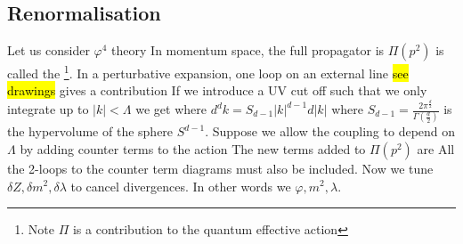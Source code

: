 \documentclass{article}
\begin{document}
\subsection{Renormalisation}
Let us consider $\varphi^4$ theory 
In momentum space, the full propagator is 
$\Pi(p^2)$ is called the \footnote{Note $\Pi$ is a contribution to the quantum effective action}. In a perturbative expansion, one loop on an external line \hl{see drawings} gives a contribution
If we introduce a UV cut off such that we only integrate up to $|k| < \Lambda$ we get 
where $d^d k = S_{d-1} |k|^{d-1} d|k|$ where $S_{d-1}=\frac{2\pi^\frac{d}{2}}{\Gamma\left(\frac{d}{2}\right)}$ is the hypervolume of the sphere $S^{d-1}$. 
Suppose we allow the coupling to depend on $\Lambda$ by adding counter terms to the action 
The new terms added to $\Pi(p^2)$ are 
All the 2-loops to the counter term diagrams must also be included. Now we tune $\delta Z, \delta m^2 , \delta \lambda$ to cancel divergences. In other words we  $\varphi, m^2, \lambda$. 
\end{document}
